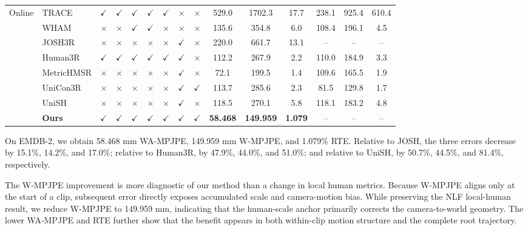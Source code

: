 \documentclass{article}
\newcommand{\cmark}{\ensuremath{\checkmark}}
\newcommand{\xmark}{\ensuremath{\times}}
\newcommand{\cmarkcolor}{\textcolor{tablegreen}{\cmark}}
\newcommand{\xmarkcolor}{\textcolor{tablered}{\xmark}}
\begin{document}
\begin{table}[t]
{\begin{tabular}{@{}llcccc|ccc|ccc|ccc@{}}
\midrule
\multirow{8}{*}{Online} & TRACE & \cmarkcolor & \cmarkcolor & \cmarkcolor & \cmarkcolor & \cmarkcolor & \xmarkcolor & \xmarkcolor & 529.0 & 1702.3 & 17.7 & 238.1 & 925.4 & 610.4 \\
 & WHAM & \xmarkcolor & \xmarkcolor & \cmarkcolor & \cmarkcolor & \xmarkcolor & \xmarkcolor & \xmarkcolor & 135.6 & 354.8 & 6.0 & 108.4 & 196.1 & 4.5 \\
 & JOSH3R & \xmarkcolor & \xmarkcolor & \xmarkcolor & \xmarkcolor & \xmarkcolor & \cmarkcolor & \xmarkcolor & 220.0 & 661.7 & 13.1 & -- & -- & -- \\
 & Human3R & \cmarkcolor & \cmarkcolor & \cmarkcolor & \cmarkcolor & \cmarkcolor & \cmarkcolor & \xmarkcolor & 112.2 & 267.9 & 2.2 & 110.0 & 184.9 & 3.3 \\
 & MetricHMSR & \xmarkcolor & \xmarkcolor & \xmarkcolor & \xmarkcolor & \xmarkcolor & \cmarkcolor & \xmarkcolor & 72.1 & 199.5 & 1.4 & 109.6 & 165.5 & 1.9 \\
 & UniCon3R & \xmarkcolor & \xmarkcolor & \xmarkcolor & \xmarkcolor & \xmarkcolor & \cmarkcolor & \cmarkcolor & 113.7 & 285.6 & 2.3 & 81.5 & 129.8 & 1.7 \\
 & UniSH & \xmarkcolor & \xmarkcolor & \xmarkcolor & \xmarkcolor & \xmarkcolor & \cmarkcolor & \xmarkcolor & 118.5 & 270.1 & 5.8 & 118.1 & 183.2 & 4.8 \\
 & \textbf{Ours} & \cmarkcolor & \cmarkcolor & \cmarkcolor & \cmarkcolor & \cmarkcolor & \cmarkcolor & \cmarkcolor & \textbf{58.468} & \textbf{149.959} & \textbf{1.079} & -- & -- & -- \\
\bottomrule
\end{tabular}
}
\end{table}

On EMDB-2, we obtain 58.468 mm WA-MPJPE, 149.959 mm W-MPJPE, and 1.079\% RTE. Relative to JOSH, the three errors decrease by 15.1\%, 14.2\%, and 17.0\%; relative to Human3R, by 47.9\%, 44.0\%, and 51.0\%; and relative to UniSH, by 50.7\%, 44.5\%, and 81.4\%, respectively.

The W-MPJPE improvement is more diagnostic of our method than a change in local human metrics. Because W-MPJPE aligns only at the start of a clip, subsequent error directly exposes accumulated scale and camera-motion bias. While preserving the NLF local-human result, we reduce W-MPJPE to 149.959 mm, indicating that the human-scale anchor primarily corrects the camera-to-world geometry. The lower WA-MPJPE and RTE further show that the benefit appears in both within-clip motion structure and the complete root trajectory.
\end{document}
